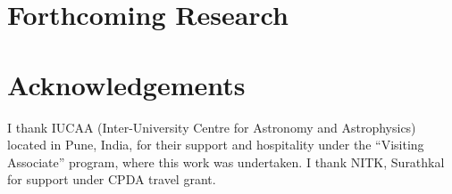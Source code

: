 \documentclass[a0,portrait]{a0poster}
\begin{document}
\begin{multicols}{3}

\section*{Forthcoming Research}





\section*{Acknowledgements}

I thank IUCAA (Inter-University Centre for Astronomy and Astrophysics) located in Pune, India, for their support and hospitality under the ``Visiting Associate'' program, where this work was undertaken. I thank NITK, Surathkal for support under CPDA travel grant.


\printbibliography[title={References}]

\end{multicols}
\end{document}
